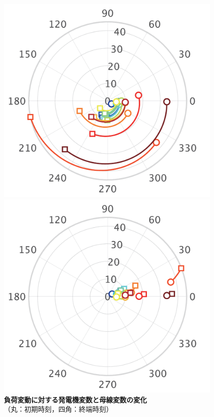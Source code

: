\documentclass[tombow,dvipdfmx]{corona-a5-1.1}
\begin{document}
\begin{figure}[t!]
{\begin{minipage}{0.49\linewidth}
  \end{minipage}
 \begin{minipage}{0.49\linewidth}
    \centering
    \includegraphics[width = 0.9\linewidth]{figs/Ipolar}
    \medskip
  \end{minipage}
  \begin{minipage}{0.49\linewidth}
    \centering
    \includegraphics[width = 0.9\linewidth]{figs/PQpolar}
    \medskip
  \end{minipage}
  }
  \medskip
  \caption{\textbf{負荷変動に対する発電機変数と母線変数の変化}
  \\  \centering（丸：初期時刻，四角：終端時刻）}
  \label{fig:polars}
\medskip
\end{figure}
\end{document}
